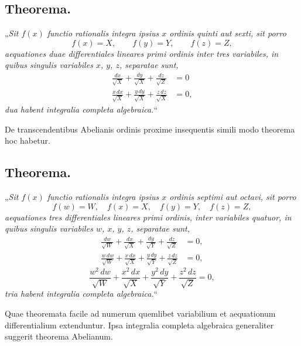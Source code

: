 \documentclass{article}
\begin{document}
\subsection*{Theorema.}

„\emph{Sit $f(x)$ functio rationalis integra ipsius $x$ ordinis quinti aut sexti, sit porro}
\[ f(x) = X, \qquad f(y) = Y, \qquad f(z) = Z, \]
\emph{aequationes duae differentiales lineares primi ordinis inter tres variabiles, in quibus singulis variabiles $x$, $y$, $z$, separatae sunt,}
\[ \begin{aligned} \frac{dx}{\sqrt{X}} + \frac{dy}{\sqrt{X}} + \frac{dz}{\sqrt{Z}} &= 0 \\ \frac{x\,dx}{\sqrt{X}} + \frac{y\,dy}{\sqrt{X}} + \frac{z\,dz}{\sqrt{X}} &= 0, \end{aligned} \]
\emph{dua habent integralia completa algebraica.}“

De transcendentibus Abelianis ordinis proxime insequentis simili modo theorema hoc habetur.

\subsection*{Theorema.}

„\emph{Sit $f(x)$ functio rationalis integra ipsius $x$ ordinis septimi aut octavi, sit porro}
\[ f(w) = W, \quad f(x) = X, \quad f(y) = Y, \quad f(z) = Z, \]
\emph{aequationes tres differentiales lineares primi ordinis, inter variabiles quatuor, in quibus singulis variabiles $w$, $x$, $y$, $z$, separatae sunt,}
\[ \begin{aligned} \frac{dw}{\sqrt{W}} + \frac{dx}{\sqrt{X}} + \frac{dy}{\sqrt{Y}} + \frac{dz}{\sqrt{Z}} &= 0, \\ \frac{w\,dw}{\sqrt{W}} + \frac{x\,dx}{\sqrt{X}} + \frac{y\,dy}{\sqrt{Y}} + \frac{z\,dz}{\sqrt{Z}} &= 0, \end{aligned} \]
\[ \frac{w^{2}\,dw}{\sqrt{W}} + \frac{x^{2}\,dx}{\sqrt{X}} + \frac{y^{2}\,dy}{\sqrt{Y}} + \frac{z^{2}\,dz}{\sqrt{Z}} = 0, \]
\emph{tria habent integralia completa algebraica.}“

Quae theoremata facile ad numerum quemlibet variabilium et aequationum differentialium extenduntur. Ipsa integralia completa algebraica generaliter suggerit theorema Abelianum.
\end{document}
